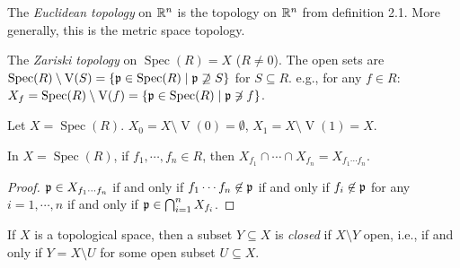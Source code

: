 \begin{example}
    The \emph{Euclidean topology} on $\mathbb{R}^n$ is the topology on $\mathbb{R}^n$ from definition 2.1. More generally, this is the metric space topology.
\end{example}

\begin{definition}
    The \emph{Zariski topology} on $\operatorname{Spec}(R) = X$ ($R \neq 0$). The open sets are $\operatorname{Spec}(R) \setminus \operatorname{V}(S) = \{\mathfrak{p} \in \operatorname{Spec}(R) \mid \mathfrak{p} \not \supseteq S\}$ for $S \subseteq R$. e.g., for any $f \in R$: $X_f = \operatorname{Spec}(R) \setminus \operatorname{V}(f) = \{\mathfrak{p} \in \operatorname{Spec}(R) \mid \mathfrak{p} \not \ni f\}$.
\end{definition}

\begin{proposition}
\end{proposition}

\begin{example}

\end{example}

\begin{fact}
    Let $X = \operatorname{Spec}(R)$. $X_0 = X \setminus \operatorname{V}(0) = \emptyset$, $X_1 = X \setminus \operatorname{V}(1) = X$.
\end{fact}

\begin{proposition}
    In $X = \operatorname{Spec}(R)$, if $f_1,\cdots,f_n \in R$, then $X_{f_1} \cap \cdots \cap X_{f_n} = X_{f_1 \cdots f_n}$.
\end{proposition}

\begin{proof}
    $\mathfrak{p} \in X_{f_1 \cdots f_n}$ if and only if $f_1 \cdots f_n \not \in \mathfrak{p}$ if and only if $f_i \not \in \mathfrak{p}$ for any $i = 1,\cdots,n$ if and only if $\mathfrak{p} \in \bigcap_{i=1}^n X_{f_i}$.
\end{proof}

\begin{definition}
    If $X$ is a topological space, then a subset $Y \subseteq X$ is \emph{closed} if $X \setminus Y$ open, i.e., if and only if $Y = X \setminus U$ for some open subset $U \subseteq X$.
\end{definition}

\begin{example}

\end{example}

